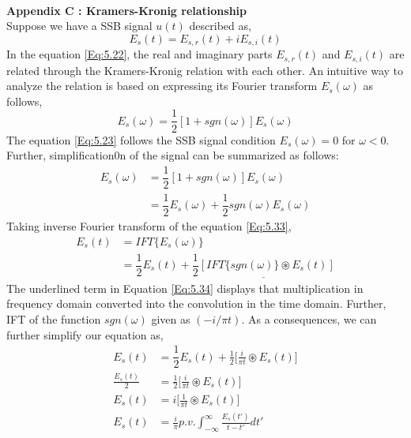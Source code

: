 \\
\textbf{Appendix C : Kramers-Kronig relationship}\\
Suppose we have a SSB signal $u(t)$ described as,
\begin{equation}
E_s(t)=E_{s,r}(t)+iE_{s,i}(t)
\label{Eq:5.31}
\end{equation}
In the equation \ref{Eq:5.22}, the real and imaginary parts $E_{s,r}(t)$ and $E_{s,i}(t)$ are related through the Kramers-Kronig relation with each other. An intuitive way to analyze the relation is based on expressing its Fourier transform $E_s(\omega)$ as follows,
\begin{equation}
E_s(\omega)=\dfrac{1}{2}[1+sgn(\omega)]E_s(\omega)
\label{Eq:5.23}
\end{equation}
The equation \ref{Eq:5.23} follows the SSB signal condition $E_s(\omega)=0$ for $\omega<0$. Further, simplification0n of the signal can be summarized as follows:
\begin{equation}
\begin{split}
E_s(\omega)&=\dfrac{1}{2}[1+sgn(\omega)]E_s(\omega)\\
&=\dfrac{1}{2}E_s(\omega)+\dfrac{1}{2}sgn(\omega)E_s(\omega)
\end{split}
\label{Eq:5.33}
\end{equation}
Taking inverse Fourier transform of the equation \ref{Eq:5.33},
\begin{equation}
\begin{split}
{E_s}(t)&=IFT\{E_s(\omega)\}\\
&=\dfrac{1}{2}{E_s}(t)+\underline{\dfrac{1}{2}[IFT\{sgn(\omega)\} \circledast {E_s}(t)]}
\end{split}
\label{Eq:5.34}
\end{equation}
The underlined term in Equation \ref{Eq:5.34} displays that multiplication in frequency domain converted into the convolution in the time domain. Further, IFT of the function $sgn(\omega)$ given as $(-i/\pi t)$. As a consequences, we can further simplify our equation as,
\begin{equation}
\begin{split}
{E_s}(t)&=\dfrac{1}{2}{E_s}(t)+\frac{1}{2}\bigg[\frac{i}{\pi t} \circledast {E_s}(t) \bigg]\\
\frac{{E_s}(t)}{2} &=\frac{1}{2}\bigg[\frac{i}{\pi t} \circledast {E_s}(t) \bigg]\\
{E_s}(t) &=i\bigg[\frac{1}{\pi t} \circledast {E_s}(t) \bigg]\\
{E_s}(t) &=\frac{i}{\pi} p.v. \int_{-\infty}^{\infty} \frac{E_s(t')}{t-t'} dt' 
\end{split}
\label{Eq:5.35}
\end{equation}
